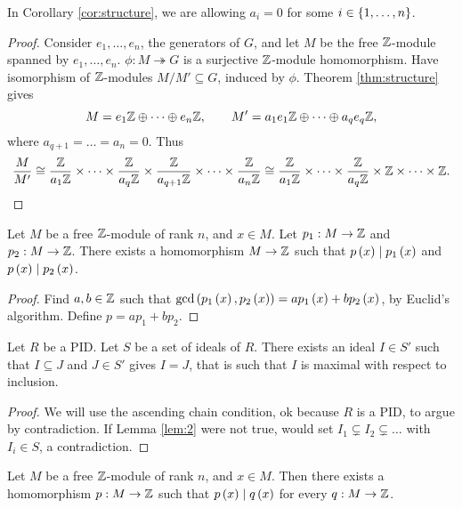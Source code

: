 \begin{remark*}
In Corollary \ref{cor:structure}, we are allowing $ a_i = 0 $ for some $ i \in \left\{ 1, \dots, n \right\} $.
\end{remark*}

\begin{proof}
Consider $ e_1, \dots, e_n $, the generators of $ G $, and let $ M $ be the free $ \mathbb{Z} $-module spanned by $ e_1, \dots, e_n $. $ \phi : M \twoheadrightarrow G $ is a surjective $ \mathbb{Z} $-module homomorphism. Have isomorphism of $ \mathbb{Z} $-modules $ M / M' \subseteq G $, induced by $ \phi $. Theorem \ref{thm:structure} gives
$$ M = e_1\mathbb{Z} \oplus \dots \oplus e_n\mathbb{Z}, \qquad M' = a_1e_1\mathbb{Z} \oplus \dots \oplus a_qe_q\mathbb{Z}, $$
where $ a_{q + 1} = \dots = a_n = 0 $. Thus
$$ \dfrac{M}{M'} \cong \dfrac{\mathbb{Z}}{a_1\mathbb{Z}} \times \dots \times \dfrac{\mathbb{Z}}{a_q\mathbb{Z}} \times \dfrac{\mathbb{Z}}{a_{q + 1}\mathbb{Z}} \times \dots \times \dfrac{\mathbb{Z}}{a_n\mathbb{Z}} \cong \dfrac{\mathbb{Z}}{a_1\mathbb{Z}} \times \dots \times \dfrac{\mathbb{Z}}{a_q\mathbb{Z}} \times \mathbb{Z} \times \dots \times \mathbb{Z}. $$
\end{proof}

\begin{lemma}
\label{lem:1}
Let $ M $ be a free $ \mathbb{Z} $-module of rank $ n $, and $ x \in M $. Let $ p_1 : M \to \mathbb{Z} $ and $ p_2 : M \to \mathbb{Z} $. There exists a homomorphism $ M \to \mathbb{Z} $ such that $ p\left( x \right) \mid p_1\left( x \right) $ and $ p\left( x \right) \mid p_2\left( x \right) $.
\end{lemma}

\begin{proof}
Find $ a, b \in \mathbb{Z} $ such that $ \gcd\left( p_1\left( x \right), p_2\left( x \right) \right) = ap_1\left( x \right) + bp_2\left( x \right) $, by Euclid's algorithm. Define $ p = ap_1 + bp_2 $.
\end{proof}

\begin{lemma}
\label{lem:2}
Let $ R $ be a PID. Let $ S $ be a set of ideals of $ R $. There exists an ideal $ I \in S' $ such that $ I \subseteq J $ and $ J \in S' $ gives $ I = J $, that is such that $ I $ is maximal with respect to inclusion.
\end{lemma}

\begin{proof}
We will use the ascending chain condition, ok because $ R $ is a PID, to argue by contradiction. If Lemma \ref{lem:2} were not true, would set $ I_1 \subsetneq I_2 \subsetneq \dots $ with $ I_i \in S $, a contradiction.
\end{proof}

\begin{lemma}
\label{lem:3}
Let $ M $ be a free $ \mathbb{Z} $-module of rank $ n $, and $ x \in M $. Then there exists a homomorphism $ p : M \to \mathbb{Z} $ such that $ p\left( x \right) \mid q\left( x \right) $ for every $ q : M \to \mathbb{Z} $.
\end{lemma}

